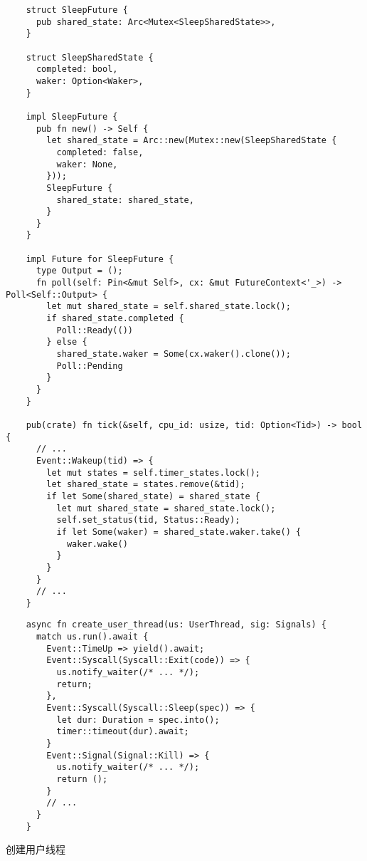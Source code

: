 \documentclass[UTF-8]{ctexart}
\begin{document}
  {
  \begin{verbatim}
    struct SleepFuture {
      pub shared_state: Arc<Mutex<SleepSharedState>>,
    }

    struct SleepSharedState {
      completed: bool,
      waker: Option<Waker>,
    }

    impl SleepFuture {
      pub fn new() -> Self {
        let shared_state = Arc::new(Mutex::new(SleepSharedState {
          completed: false,
          waker: None,
        }));
        SleepFuture {
          shared_state: shared_state,
        }
      }
    }

    impl Future for SleepFuture {
      type Output = ();
      fn poll(self: Pin<&mut Self>, cx: &mut FutureContext<'_>) -> Poll<Self::Output> {
        let mut shared_state = self.shared_state.lock();
        if shared_state.completed {
          Poll::Ready(())
        } else {
          shared_state.waker = Some(cx.waker().clone());
          Poll::Pending
        }
      }
    }    

    pub(crate) fn tick(&self, cpu_id: usize, tid: Option<Tid>) -> bool {
      // ...
      Event::Wakeup(tid) => {
        let mut states = self.timer_states.lock();
        let shared_state = states.remove(&tid);
        if let Some(shared_state) = shared_state {
          let mut shared_state = shared_state.lock();
          self.set_status(tid, Status::Ready);
          if let Some(waker) = shared_state.waker.take() {
            waker.wake()
          }
        }
      }
      // ...
    }
  \end{verbatim}
  }

  \begin{listing}
  \begin{verbatim}
    async fn create_user_thread(us: UserThread, sig: Signals) {
      match us.run().await {
        Event::TimeUp => yield().await;
        Event::Syscall(Syscall::Exit(code)) => {
          us.notify_waiter(/* ... */);
          return;
        },
        Event::Syscall(Syscall::Sleep(spec)) => {
          let dur: Duration = spec.into();
          timer::timeout(dur).await;
        }
        Event::Signal(Signal::Kill) => {
          us.notify_waiter(/* ... */);
          return ();
        }
        // ...
      }
    }
  \end{verbatim}
  \caption{创建用户线程}
  \label{src:create_user_thread}
  \end{listing}
\end{document}
